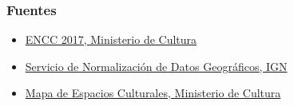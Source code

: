 \documentclass[10pt]{beamer}
\begin{document}
\begin{frame}
  \frametitle{Fuentes}
  \begin{itemize}
    \item \href{https://datos.cultura.gob.ar/dataset/encuesta-nacional-de-consumos-culturales-2017}{ENCC 2017, Ministerio de Cultura}\\
    \item \href{https://datos.gob.ar/dataset/jgm-servicio-normalizacion-datos-geograficos/archivo/jgm_8.26}{Servicio de Normalización de Datos Geográficos, IGN}
    \item \href{https://datos.gob.ar/dataset/cultura-mapa-cultural-espacios-culturales}{Mapa de Espacios Culturales, Ministerio de Cultura}
  \end{itemize}
  
\end{frame}
\end{document}
